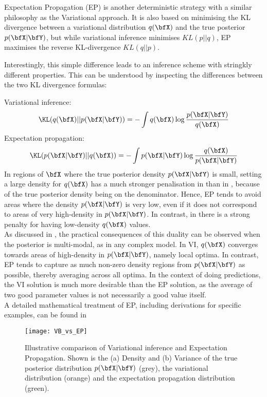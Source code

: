 Expectation Propagation (EP) is another deterministic strategy with a similar philosophy as the Variational approach. It is also based on minimising the KL divergence between a variational distribution $q(\bfX)$ and the true posterior $p(\bfX|\bfY)$, but while variational inference minimises $KL(p||q)$, EP maximises the reverse KL-divergence $KL(q||p)$.

Interestingly, this simple difference leads to an inference scheme with stringkly different properties. This can be understood by inspecting the differences between the two KL divergence formulas:

Variational inference:
\begin{equation} \label{eq:kl_vb}
	\KL(q(\bfX)||p(\bfX|\bfY)) = - \int q(\bfX) \log \frac{p(\bfX|\bfY)}{q(\bfX)}
\end{equation}
Expectation propagation:
\begin{equation} \label{eq:kl_ep}
	\KL(p(\bfX|\bfY)||q(\bfX)) = - \int p(\bfX|\bfY) \log \frac{q(\bfX)}{p(\bfX|\bfY)}
\end{equation}
In regions of $\bfX$ where the true posterior density $p(\bfX|\bfY)$ is small, setting a large density for $q(\bfX)$ has a much stronger penalisation in  than in , because of the true posterior density being on the denominator. Hence, EP tends to avoid areas where the density $p(\bfX|\bfY)$ is very low, even if it does not correspond to areas of very high-density in $p(\bfX|\bfY)$. In contrast, in  there is a strong penalty for having low-density $q(\bfX)$ values.\\
As discussed in \cite{Bishop2006}, the practical consequences of this duality can be observed when the posterior is multi-modal, as in any complex model. In VI, $q(\bfX)$ converges towards areas of high-density in $p(\bfX|\bfY)$, namely local optima. In contrast, EP tends to capture as much non-zero density regions from $p(\bfX|\bfY)$ as possible, thereby averaging across all optima. In the context of doing predictions, the VI solution is much more desirable than the EP solution, as the average of two good parameter values is not necessarily a good value itself.\\
A detailed mathematical treatment of EP, including derivations for specific examples, can be found in \cite{Bishop2006,Murphy,Minka2001}

\begin{figure}[H]
	\centering
	\texttt{[image: VB\_vs\_EP]}
	\caption{Illustrative comparison of Variational inference and Expectation Propagation. Shown is the (a) Density and (b) Variance of the true posterior distribution $p(\bfX|\bfY)$ (grey), the variational distribution (orange) and the expectation propagation distribution (green).}
	\label{}
\end{figure}

